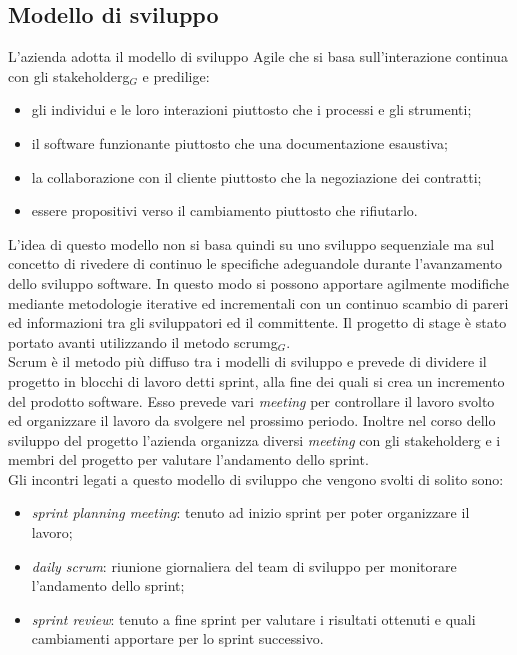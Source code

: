 \subsection{Modello di sviluppo}
\label{subsec:modello-sviluppo}

L'azienda adotta il modello di sviluppo Agile che si basa sull'interazione continua con gli \gls{stakeholderg}$_G$ e predilige:
\begin{itemize}
	\item gli individui e le loro interazioni piuttosto che i processi e gli strumenti;
	\item il software funzionante piuttosto che una documentazione esaustiva;
	\item la collaborazione con il cliente piuttosto che la negoziazione dei contratti;
	\item essere propositivi verso il cambiamento piuttosto che rifiutarlo.
\end{itemize}
L'idea di questo modello non si basa quindi su uno sviluppo sequenziale ma sul concetto di rivedere di continuo le specifiche adeguandole durante l'avanzamento dello sviluppo software. In questo modo si possono apportare agilmente modifiche mediante metodologie iterative ed incrementali con un continuo scambio di pareri ed informazioni tra gli sviluppatori ed il committente. Il progetto di stage è stato portato avanti utilizzando il metodo \gls{scrumg}$_G$.\\
Scrum è il metodo più diffuso tra i modelli di sviluppo e prevede di dividere il progetto in blocchi di lavoro detti sprint, alla fine dei quali si crea un incremento del prodotto software. Esso prevede vari \textit{meeting} per controllare il lavoro svolto ed organizzare il lavoro da svolgere nel prossimo periodo. Inoltre nel corso dello sviluppo del progetto l'azienda organizza diversi \textit{meeting} con gli \gls{stakeholderg} e i membri del progetto per valutare l'andamento dello sprint.\\
Gli incontri legati a questo modello di sviluppo che vengono svolti di solito sono:
\begin{itemize}
	\item \textit{sprint planning meeting}: tenuto ad inizio sprint per poter organizzare il lavoro;
	\item \textit{daily scrum}: riunione giornaliera del team di sviluppo per monitorare l'andamento dello sprint;
	\item \textit{sprint review}: tenuto a fine sprint per valutare i risultati ottenuti e quali cambiamenti apportare per lo sprint successivo.
\end{itemize}
